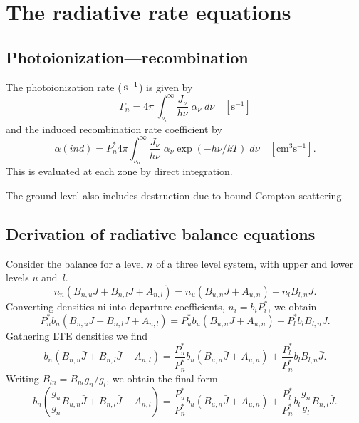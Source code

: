 \section{The radiative rate equations}

\subsection{Photoionization---recombination}

The photoionization rate (${\rm\thinspace s^{-1}}$) is given by
\begin{equation}
{\Gamma _n} = 4\pi \,\int_{{\nu _o}}^\infty  {\frac{{{J_\nu }}}{{h\nu
}}\;{\alpha _\nu }\;d\nu }\quad [\mathrm{s}^{-1}]
\end{equation}
and the induced recombination rate coefficient by
\begin{equation}
\label{eqn:InducedRecombinationRateCoefficient}
\alpha \left( {ind} \right) = P_n^*4\pi \int_{{\nu _o}}^\infty
{\frac{{{J_\nu }}}{{h\nu }}\;{\alpha _\nu }\exp \left( { - h\nu /kT}
\right)\;d\nu }\quad  [\mathrm{cm}^3 \mathrm{s}^{-1}].
\end{equation}
This is evaluated at each zone by direct integration.

The ground level also includes destruction due to bound Compton scattering.

\subsection{Derivation of radiative balance equations}

Consider the balance for a level $n$ of a three level system, with upper
and lower levels $u$ and~$l$.
\begin{equation}
{n_n}\left( {{B_{n,u}}\bar J + {B_{n,l}}\bar J + {A_{n,l}}} \right) =
{n_u}\left( {{B_{u,n}}\bar J + {A_{u,n}}} \right) + {n_l}{B_{l,n}}\bar J.
\end{equation}
Converting densities ni into departure coefficients, ${n_i} = {b_i}P_i^*$, we obtain
\begin{equation}
P_n^*{b_n}\left( {{B_{n,u}}\bar J + {B_{n,l}}\bar J + {A_{n,l}}} \right)
= P_u^*{b_u}\left( {{B_{u,n}}\bar J + {A_{u,n}}} \right) +
P_l^*{b_l}{B_{l,n}}\bar J.
\end{equation}
Gathering LTE densities we find
\begin{equation}
{b_n}\left( {{B_{n,u}}\bar J + {B_{n,l}}\bar J + {A_{n,l}}} \right) =
\frac{{P_u^*}}{{P_n^*}}{b_u}\left( {{B_{u,n}}\bar J + {A_{u,n}}} \right)
+ \frac{{P_l^*}}{{P_n^*}}{b_l}{B_{l,n}}\bar J.
\end{equation}
Writing $B_{ln} = B_{nl} g_n/g_l$, we obtain the final form
\begin{equation}
{b_n}\left( {\frac{{{g_u}}}{{{g_n}}}{B_{u,n}}\bar J + {B_{n,l}}\bar J
+ {A_{n,l}}} \right) = \frac{{P_u^*}}{{P_n^*}}{b_u}\left( {{B_{u,n}}\bar
J + {A_{u,n}}} \right) +
\frac{{P_l^*}}{{P_n^*}}{b_l}\frac{{{g_n}}}{{{g_l}}}{B_{n,l}}\bar J.
\end{equation}


